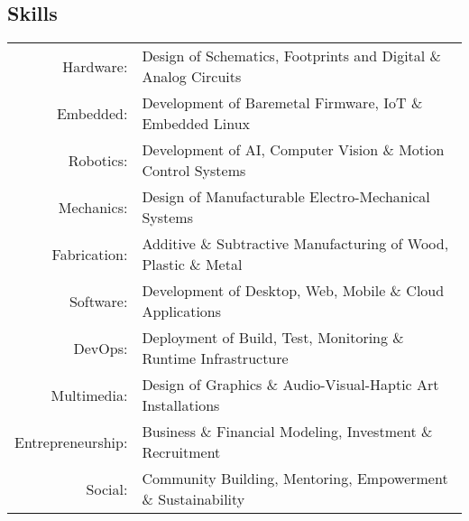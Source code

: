\subsection{Skills}
\begin{longtable}
		{r p{10cm}}
		Hardware:& Design of Schematics, Footprints and Digital \& Analog Circuits\\
		Embedded:& Development of Baremetal Firmware, IoT \& Embedded Linux\\
		Robotics:& Development of AI, Computer Vision \& Motion Control Systems\\
		Mechanics:& Design of Manufacturable Electro-Mechanical Systems\\
		Fabrication:& Additive \& Subtractive Manufacturing of Wood, Plastic \& Metal\\
		Software:& Development of Desktop, Web, Mobile \& Cloud Applications\\
		DevOps:& Deployment of Build, Test, Monitoring \& Runtime Infrastructure\\
		Multimedia:& Design of Graphics \& Audio-Visual-Haptic Art Installations\\
		Entrepreneurship:& Business \& Financial Modeling, Investment \& Recruitment\\
		Social:& Community Building, Mentoring, Empowerment \& Sustainability\\
\end{longtable}
